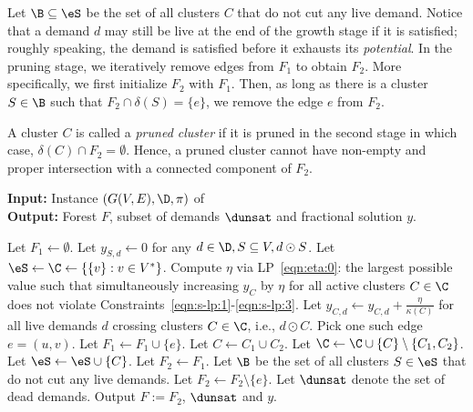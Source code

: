  Let $\B\subseteq\eS$ be the set of all clusters $C$ that do not
cut any live demand.  
Notice that a demand $d$ may still be live at the end of the growth stage
if it is satisfied; roughly speaking, the demand is satisfied before it exhausts
its \emph{potential}.
In the pruning stage, we
iteratively remove edges from $F_1$ to obtain $F_2$.  More
specifically, we first initialize $F_2$ with $F_1$.  Then, as long as
there is a cluster $S\in\B$ such that $F_2\cap\delta(S) = \{e\}$, we remove the edge $e$ from
$F_2$. 

A cluster $C$ is called a \emph{pruned cluster} if it is pruned in the
second stage in which case, $\delta(C)\cap F_2 = \emptyset$.  Hence, a
pruned cluster cannot have non-empty and proper intersection with a
connected component of $F_2$.


\begin{algorithm}
\caption{\label{alg:submod-pc-cluster}}
\textbf{Input:} Instance $(G(V,E), \D, \pi)$ of \\
\textbf{Output:} Forest $F$, subset of demands $\dunsat$ and fractional solution $y$.

\begin{algorithmic}[1]
\STATE Let $F_1\gets\emptyset$.
 \STATE Let $y_{S,d}\gets 0$ for any $d\in\D, S\subseteq V, d\odot S$.
 \STATE Let $\eS\gets\C\gets\left\{ \{v\}: v\in V^\ast\right\}$.
\STATE Compute $\eta$ via LP~\eqref{eqn:eta:0}:
the largest possible value such that simultaneously 
increasing  $y_{C}$ by $\eta$ for all active clusters $C \in \C$ does not violate Constraints~\eqref{eqn:s-lp:1}-\eqref{eqn:s-lp:3}.
\STATE Let $y_{C,d}\gets y_{C,d}+\frac{\eta}{\kappa(C)}$ for all live demands $d$ crossing clusters $C \in \C$, i.e., $d \odot C$.
   \STATE Pick one such edge $e=(u,v)$.
   \STATE Let $F_1\gets F_1\cup \{e\}$.
   \STATE Let $C \gets C_1 \cup C_2$.
   \STATE Let $\C\gets \C\cup \{C\} \setminus \{C_1, C_2\}$.
   \STATE Let $\eS \gets \eS \cup \{C\}$.
  \ENDIF
\ENDWHILE
\STATE Let $F_2 \gets F_1$.
\STATE Let $\B$ be the set of all clusters $S\in\eS$ that
do not cut any live demands.
  \STATE Let $F_2 \gets F_2 \setminus \{e\}$.
\ENDWHILE
\STATE Let $\dunsat$ denote the set of dead demands.
\STATE Output $F := F_2$, $\dunsat$ and $y$.
\end{algorithmic}
\end{algorithm}
















